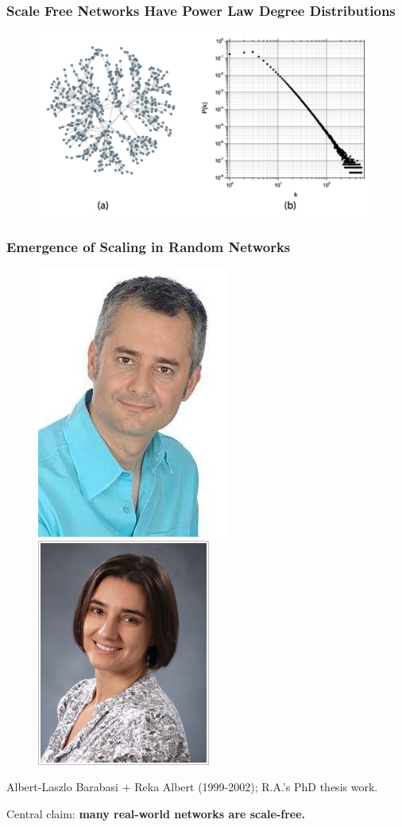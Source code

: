 \documentclass{beamer}
\begin{document}
		\begin{frame}\frametitle{\alert{Scale Free} Networks Have \alert{Power Law} Degree Distributions}
		  \begin{figure}
		  	\centering
		  	\includegraphics[width=\textwidth]{pl_example}
		  	\caption{} \label{fig:}
		  \end{figure}
		\end{frame}

		
		\begin{frame}\frametitle{Emergence of Scaling in Random Networks}
			\begin{figure}
				\centering
				\includegraphics[width=.3\textwidth]{barabasicropped}
				\includegraphics[width=.3\textwidth]{ralbert-photo}
			\end{figure}

			Albert-Laszlo Barabasi + Reka Albert (1999-2002); R.A.'s PhD thesis work.
			
			Central claim: \textbf{many real-world networks are scale-free.}
		\end{frame}
\end{document}
